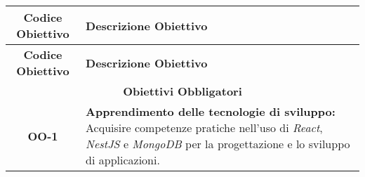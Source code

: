 \begin{longtable}{|c|>{\centering\arraybackslash}p{}|} %
    \hline
    \rowcolor{green!30} %
    \textbf{Codice Obiettivo} & \textbf{Descrizione Obiettivo} \\
    \hline
    \endfirsthead %
    
    \hline
    \rowcolor{green!30} %
    \textbf{Codice Obiettivo} & \textbf{Descrizione Obiettivo} \\
    \hline
    \endhead %
    
    \hline
    \multicolumn{2}{|c|}{\rowcolor{green!30} \textbf{Obiettivi Obbligatori}} \\
    \hline %
    \textbf{OO-1} & \textbf{Apprendimento delle tecnologie di sviluppo:} Acquisire competenze pratiche nell'uso di \textit{React}, \textit{NestJS} e \textit{MongoDB} per la progettazione e lo sviluppo di applicazioni. \\


\end{longtable}
